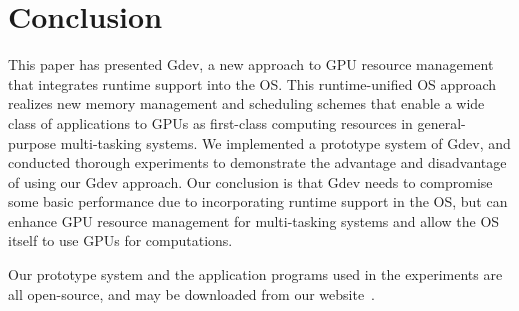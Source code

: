 \vspace{-0.25em}
\section{Conclusion}
\label{sec:conclusion}
\vspace{-0.25em}

This paper has presented Gdev, a new approach to GPU resource management
that integrates runtime support into the OS.
This runtime-unified OS approach realizes new memory management and
scheduling schemes that enable a wide class of applications to GPUs as
first-class computing resources in general-purpose multi-tasking systems.
We implemented a prototype system of Gdev, and conducted thorough
experiments to demonstrate the advantage and disadvantage of using our
Gdev approach. 
Our conclusion is that Gdev needs to compromise some basic performance
due to incorporating runtime support in the OS, but can enhance GPU resource
management for multi-tasking systems and allow the OS itself to use
GPUs for computations.

Our prototype system and the application programs used in the experiments
are all open-source, and may be downloaded from our website~\cite{Gdev}.
